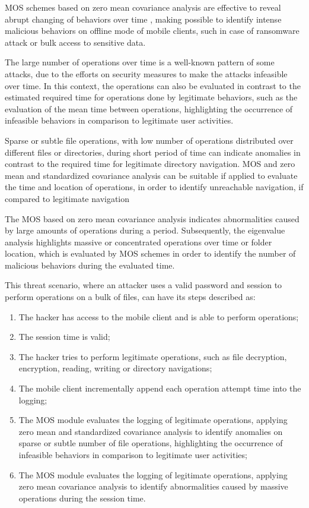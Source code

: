 \documentclass[twocolumn]{svjour3}          	%
\begin{document}
MOS schemes based on zero mean covariance analysis are effective to reveal abrupt changing of behaviors over time \cite{tenorio2013greatest}, making possible to identify intense malicious behaviors on offline mode of mobile clients, such in case of ransomware attack or bulk access to sensitive data.

The large number of operations over time is a well-known pattern of some attacks, due to the efforts on security measures to make the attacks infeasible over time. In this context, the operations can also be evaluated in contrast to the estimated required time for operations done by legitimate behaviors, such as the evaluation of the mean time between operations, highlighting the occurrence of infeasible behaviors in comparison to legitimate user activities.

Sparse or subtle file operations, with low number of operations distributed over different files or directories, during short period of time can indicate anomalies in contrast to the required time for legitimate directory navigation. MOS and zero mean and standardized covariance analysis can be suitable if applied to evaluate the time and location of operations, in order to identify unreachable navigation, if compared to legitimate navigation

The MOS based on zero mean covariance analysis indicates abnormalities caused by large amounts of operations during a period. Subsequently, the eigenvalue analysis highlights massive or concentrated operations over time or folder location, which is evaluated by MOS schemes in order to identify the number of malicious behaviors during the evaluated time.

This threat scenario, where an attacker uses a valid password and session to perform operations on a bulk of files, can have its steps described as:

\begin{enumerate}[label=(\alph*)]
	\item The hacker has access to the mobile client and is able to perform operations;
	\item The session time is valid;
	\item The hacker tries to perform legitimate operations, such as file decryption, encryption, reading, writing or directory navigations;
	\item The mobile client incrementally append each operation attempt time into the logging;
	\item The MOS module evaluates the logging of legitimate operations, applying zero mean and standardized covariance analysis to identify anomalies on sparse or subtle number of file operations, highlighting the occurrence of infeasible behaviors in comparison to legitimate user activities;
	\item The MOS module evaluates the logging of legitimate operations, applying zero mean covariance analysis to identify abnormalities caused by massive operations during the session time.
\end{enumerate}
\end{document}
